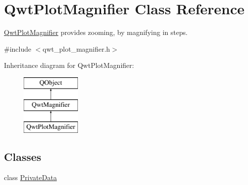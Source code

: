 \hypertarget{class_qwt_plot_magnifier}{\section{Qwt\-Plot\-Magnifier Class Reference}
\label{class_qwt_plot_magnifier}
}


\hyperlink{class_qwt_plot_magnifier}{Qwt\-Plot\-Magnifier} provides zooming, by magnifying in steps.  




{\ttfamily \#include $<$qwt\-\_\-plot\-\_\-magnifier.\-h$>$}

Inheritance diagram for Qwt\-Plot\-Magnifier\-:\begin{figure}[H]
\begin{center}
\leavevmode
\includegraphics[height=3.000000cm]{class_qwt_plot_magnifier}
\end{center}
\end{figure}
\subsection*{Classes}
\begin{DoxyCompactItemize}
\item 
class \hyperlink{class_qwt_plot_magnifier_1_1_private_data}{Private\-Data}
\end{DoxyCompactItemize}
